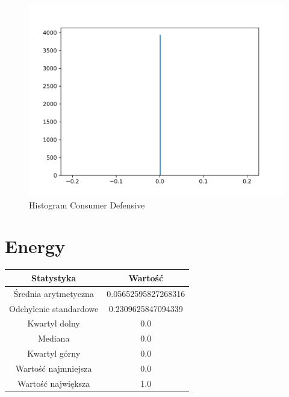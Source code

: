 \documentclass{article}
\begin{document}
\begin{figure}[h!]
    \includegraphics[width=\linewidth]{variables/Consumer Defensive.png}
    \caption{Histogram Consumer Defensive }
\end{figure}\section{ Energy }

\begin{center}
    \begin{tabular}{|c | c|} 
    \hline
    Statystyka & Wartość \\
    \hline\hline
    Średnia arytmetyczna & 0.05652595827268316 \\ 
    \hline
    Odchylenie standardowe & 0.2309625847094339 \\
    \hline
    Kwartyl dolny & 0.0 \\
    \hline
    Mediana & 0.0 \\
    \hline
    Kwartyl górny & 0.0 \\
    \hline
    Wartość najmniejsza & 0.0 \\
    \hline
    Wartość największa & 1.0 \\
    \hline
   \end{tabular}
\end{center}
\end{document}
